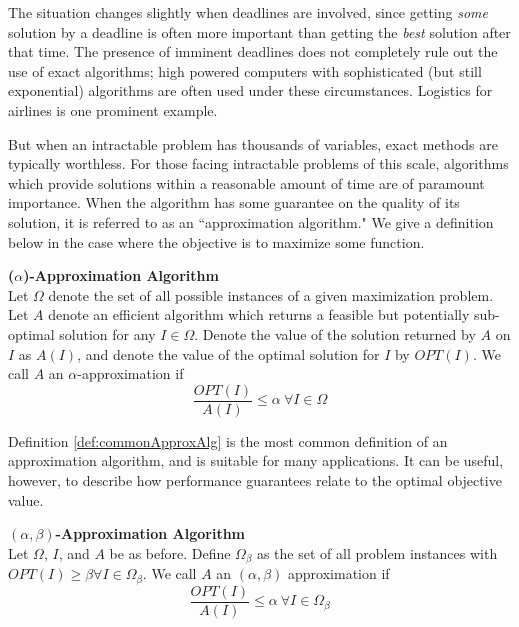 The situation changes slightly when deadlines are involved, since getting \textit{some} solution by a deadline is often more important than getting the \textit{best} solution after that time. 
The presence of imminent deadlines does not completely rule out the use of exact algorithms; high powered computers with sophisticated (but still exponential) algorithms are often used under these circumstances. 
Logistics for airlines is one prominent example.

But when an intractable problem has thousands of variables, exact methods are typically worthless. 
For those facing intractable problems of this scale, algorithms which provide solutions within a reasonable amount of time are of paramount importance.  
When the algorithm has some guarantee on the quality of its solution, it is referred to as an ``approximation algorithm."
We give a definition below in the case where the objective is to maximize some function. 

\begin{definition}
\textbf{($\alpha$)-Approximation Algorithm} \\
Let $\Omega$ denote the set of all possible instances of a given maximization problem. 
Let $A$ denote an efficient algorithm which returns a feasible but potentially sub-optimal solution for any $I \in \Omega$. 
Denote the value of the solution returned by $A$ on $I$ as $A(I)$, and denote the value of the optimal solution for $I$ by $OPT(I)$. We call $A$ an $\alpha$-approximation if
\begin{equation*}
\frac{OPT(I)}{A(I)} \leq \alpha ~ \forall I \in \Omega
\end{equation*}
\label{def:commonApproxAlg}
\end{definition}

Definition \ref{def:commonApproxAlg} is the most common definition of an approximation algorithm, and is suitable for many applications. It can be useful, however, to describe how performance guarantees relate to the optimal objective value. 
\begin{definition}
\textbf{$(\alpha,\beta)$-Approximation Algorithm } \\
Let $\Omega$, $I$, and $A$ be as before. 
Define $\Omega_\beta$ as the set of all problem instances with $OPT(I) \geq \beta \forall I \in \Omega_\beta$.
We call $A$ an $(\alpha,\beta)$ approximation if 
\begin{equation*}
\frac{OPT(I)}{A(I)} \leq \alpha ~ \forall I \in \Omega_{\beta}
\end{equation*}
\label{def:twoParamApproxAlg}
\end{definition}
\newpage